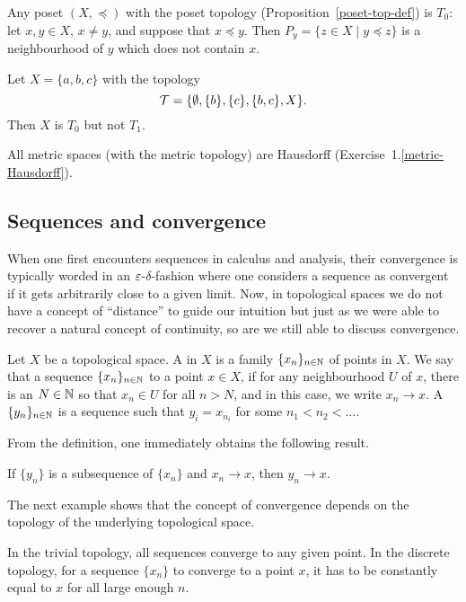 \begin{example}
  Any poset $(X,\preceq)$ with the poset topology (Proposition~\ref{poset-top-def}) is $T_0$: let $x,y \in X$, $x \not= y$, and suppose that $x \preceq y$. Then $P_y = \{ z \in X \mid y \preceq z\}$ is a neighbourhood of $y$ which does not contain $x$.
\end{example}
\begin{example}
  Let $X = \{a,b,c\}$ with the topology
  \[
    \mathcal{T} = \{ \emptyset, \{b\}, \{c\}, \{b,c\}, X \}.
  \]
  Then $X$ is $T_0$ but not $T_1$.
\end{example}
\begin{example}
  All metric spaces (with the metric topology) are Hausdorff (Exercise~1.\ref{metric-Hausdorff}).
\end{example}

\subsection{Sequences and convergence}
When one first encounters sequences in calculus and analysis, their convergence is typically worded in an $\varepsilon$-$\delta$-fashion where one considers a sequence as convergent if it gets arbitrarily close to a given limit. Now, in topological spaces we do not have a concept of ``distance'' to guide our intuition but just as we were able to recover a natural concept of continuity, so are we still able to discuss convergence.
\begin{defn}
  Let $X$ be a topological space. A  in $X$ is a family $\{x_n\}_{n \in \mathbb{N}}$ of points in $X$. We say that a sequence $\{x_n\}_{n \in \mathbb{N}}$  to a point $x \in X$, if for any neighbourhood $U$ of $x$, there is an $N \in \mathbb{N}$ so that $x_n \in U$ for all $n > N$, and in this case, we write $x_n \to x$. A  $\{y_n\}_{n\in \mathbb{N}}$ is a sequence such that $y_i = x_{n_i}$ for some $n_1 < n_2 < \dots$.
\end{defn}
From the definition, one immediately obtains the following result.
\begin{prop}
  If $\{y_n\}$ is a subsequence of $\{x_n\}$ and $x_n \to x$, then $y_n \to x$.
\end{prop}
The next example shows that the concept of convergence depends on the topology of the underlying topological space.
\begin{example}
  \label{example-convergence}
  In the trivial topology, all sequences converge to any given point. In the discrete topology, for a sequence $\{x_n\}$ to converge to a point $x$, it has to be constantly equal to $x$ for all large enough $n$.
\end{example}
